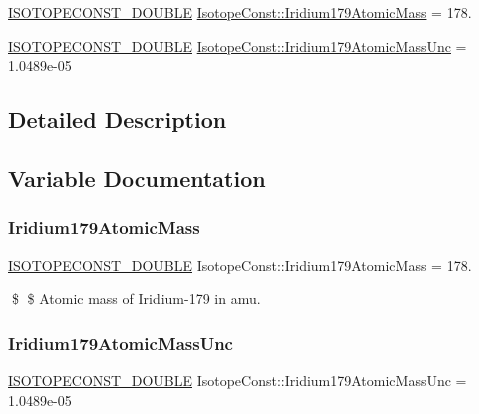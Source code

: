 \begin{DoxyCompactItemize}
\item 
\mbox{\hyperlink{group___isotope_const-_macros_ga8f45a7272ce02c0b4c65c44636ed719a}{I\+S\+O\+T\+O\+P\+E\+C\+O\+N\+S\+T\+\_\+\+D\+O\+U\+B\+LE}} \mbox{\hyperlink{group___isotope_const-_iridium-_ir179_ga840ddf0bee7e22e8a0a19f390097e4ff}{Isotope\+Const\+::\+Iridium179\+Atomic\+Mass}} = 178.
\item 
\mbox{\hyperlink{group___isotope_const-_macros_ga8f45a7272ce02c0b4c65c44636ed719a}{I\+S\+O\+T\+O\+P\+E\+C\+O\+N\+S\+T\+\_\+\+D\+O\+U\+B\+LE}} \mbox{\hyperlink{group___isotope_const-_iridium-_ir179_ga4d78218956de129c688cf04d238d4761}{Isotope\+Const\+::\+Iridium179\+Atomic\+Mass\+Unc}} = 1.\+0489e-\/05
\end{DoxyCompactItemize}


\subsection{Detailed Description}


\subsection{Variable Documentation}
\mbox{\label{group___isotope_const-_iridium-_ir179_ga840ddf0bee7e22e8a0a19f390097e4ff}} 
\subsubsection{\texorpdfstring{Iridium179\+Atomic\+Mass}{Iridium179AtomicMass}}
{\footnotesize\ttfamily \mbox{\hyperlink{group___isotope_const-_macros_ga8f45a7272ce02c0b4c65c44636ed719a}{I\+S\+O\+T\+O\+P\+E\+C\+O\+N\+S\+T\+\_\+\+D\+O\+U\+B\+LE}} Isotope\+Const\+::\+Iridium179\+Atomic\+Mass = 178.}

\$ \$ Atomic mass of Iridium-\/179 in amu. \mbox{\label{group___isotope_const-_iridium-_ir179_ga4d78218956de129c688cf04d238d4761}} 
\subsubsection{\texorpdfstring{Iridium179\+Atomic\+Mass\+Unc}{Iridium179AtomicMassUnc}}
{\footnotesize\ttfamily \mbox{\hyperlink{group___isotope_const-_macros_ga8f45a7272ce02c0b4c65c44636ed719a}{I\+S\+O\+T\+O\+P\+E\+C\+O\+N\+S\+T\+\_\+\+D\+O\+U\+B\+LE}} Isotope\+Const\+::\+Iridium179\+Atomic\+Mass\+Unc = 1.\+0489e-\/05}

